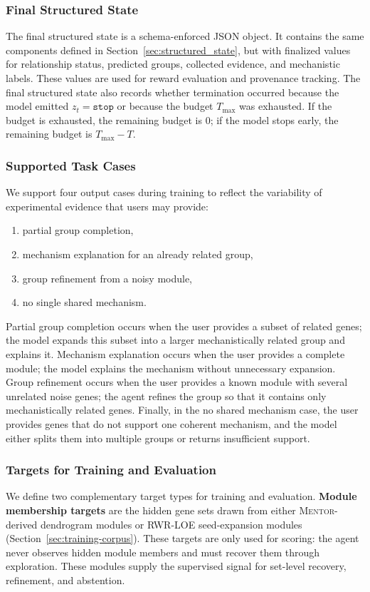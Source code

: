 \documentclass[thesis,letterpaper,12pt]{utthesis}
\begin{document}
\subsubsection{Final Structured State}
The final structured state is a schema-enforced JSON object. It contains the same components defined in Section~\ref{sec:structured_state}, but with finalized values for relationship status, predicted groups, collected evidence, and mechanistic labels. These values are used for reward evaluation and provenance tracking. The final structured state also records whether termination occurred because the model emitted $z_t = \texttt{stop}$ or because the budget $T_{\max}$ was exhausted. If the budget is exhausted, the remaining budget is $0$; if the model stops early, the remaining budget is $T_{\max} - T$.

\subsubsection{Supported Task Cases}
We support four output cases during training to reflect the variability of experimental evidence that users may provide:
\begin{enumerate}
    \item partial group completion,
    \item mechanism explanation for an already related group,
    \item group refinement from a noisy module,
    \item no single shared mechanism.
\end{enumerate}

Partial group completion occurs when the user provides a subset of related genes; the model expands this subset into a larger mechanistically related group and explains it. Mechanism explanation occurs when the user provides a complete module; the model explains the mechanism without unnecessary expansion. Group refinement occurs when the user provides a known module with several unrelated noise genes; the agent refines the group so that it contains only mechanistically related genes. Finally, in the no shared mechanism case, the user provides genes that do not support one coherent mechanism, and the model either splits them into multiple groups or returns insufficient support.

\subsubsection{Targets for Training and Evaluation}
We define two complementary target types for training and evaluation. \textbf{Module membership targets} are the hidden gene sets drawn from either \textsc{Mentor}-derived dendrogram modules or RWR-LOE seed-expansion modules (Section~\ref{sec:training-corpus}). These targets are only used for scoring: the agent never observes hidden module members and must recover them through exploration. These modules supply the supervised signal for set-level recovery, refinement, and abstention. 
\end{document}

